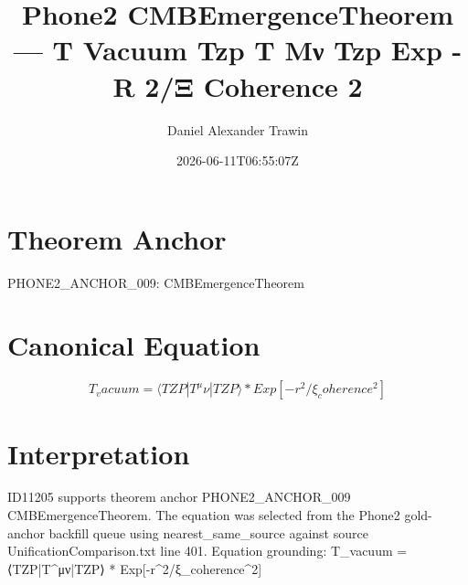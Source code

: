 \documentclass[11pt]{article}
\title{Phone2 CMBEmergenceTheorem — T Vacuum Tzp T Μν Tzp Exp -R 2/Ξ Coherence 2}
\author{Daniel Alexander Trawin}
\date{2026-06-11T06:55:07Z}
\begin{document}
\maketitle
\section*{Theorem Anchor}
PHONE2_ANCHOR_009: CMBEmergenceTheorem
\section*{Canonical Equation}
\[
T_vacuum = ⟨TZP|T^μν|TZP⟩ * Exp[-r^2/ξ_coherence^2]
\]
\section*{Interpretation}
ID11205 supports theorem anchor PHONE2_ANCHOR_009 CMBEmergenceTheorem. The equation was selected from the Phone2 gold-anchor backfill queue using nearest_same_source against source UnificationComparison.txt line 401. Equation grounding: T_vacuum = ⟨TZP|T^μν|TZP⟩ * Exp[-r^2/ξ_coherence^2]
\end{document}
